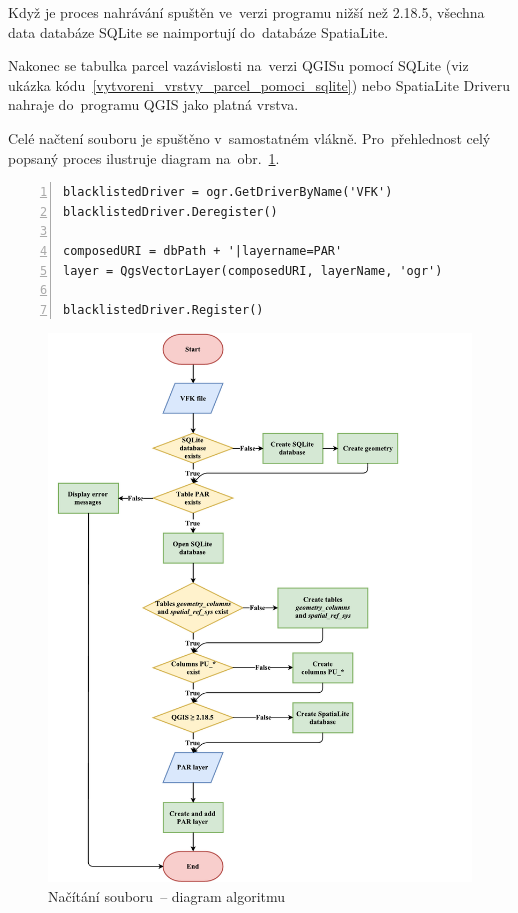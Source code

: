 Když je proces nahrávání spuštěn ve~verzi programu nižší než 2.18.5, všechna data databáze SQLite se naimportují do~databáze SpatiaLite.

Nakonec se tabulka parcel vazávislosti na~verzi QGISu pomocí SQLite (viz ukázka kódu~\ref{vytvoreni_vrstvy_parcel_pomoci_sqlite}) nebo SpatiaLite Driveru nahraje do~programu QGIS jako platná vrstva.

Celé načtení  souboru je spuštěno v~samostatném vlákně. Pro~přehlednost celý popsaný proces ilustruje diagram na~obr.~\ref{fig:diagram_nacitani_vfk}.

{\scriptsize
\begin{lstlisting}[style=python, caption={Vytvoření QGIS vrstvy parcel pomocí SQLite Driveru}, captionpos=b, label=vytvoreni_vrstvy_parcel_pomoci_sqlite, backgroundcolor = \color{light-gray},  numbers=left]
blacklistedDriver = ogr.GetDriverByName('VFK')
blacklistedDriver.Deregister()

composedURI = dbPath + '|layername=PAR'
layer = QgsVectorLayer(composedURI, layerName, 'ogr')
	
blacklistedDriver.Register()
\end{lstlisting}}

	\begin{figure}[H]
		\centering
		\includegraphics[width=1.2\textwidth]{./pictures/nacitani_vfk_souboru.pdf}
		\caption[Načítání  souboru~– diagram algoritmu]{Načítání  souboru~– diagram algoritmu}
		\label{fig:diagram_nacitani_vfk}
 	\end{figure}

